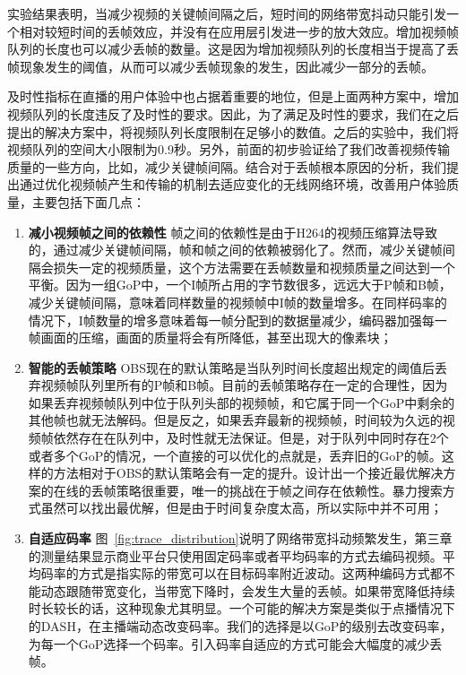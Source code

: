 实验结果表明，当减少视频的关键帧间隔之后，短时间的网络带宽抖动只能引发一个相对较短时间的丢帧效应，并没有在应用层引发进一步的放大效应。增加视频帧队列的长度也可以减少丢帧的数量。这是因为增加视频队列的长度相当于提高了丢帧现象发生的阈值，从而可以减少丢帧现象的发生，因此减少一部分的丢帧。

及时性指标在直播的用户体验中也占据着重要的地位，但是上面两种方案中，增加视频队列的长度违反了及时性的要求。因此，为了满足及时性的要求，我们在之后提出的解决方案中，将视频队列长度限制在足够小的数值。之后的实验中，我们将视频队列的空间大小限制为0.9秒。另外，前面的初步验证给了我们改善视频传输质量的一些方向，比如，减少关键帧间隔。结合对于丢帧根本原因的分析，我们提出通过优化视频帧产生和传输的机制去适应变化的无线网络环境，改善用户体验质量，主要包括下面几点：

\begin{enumerate}[1)]
\item \textbf{减小视频帧之间的依赖性} 帧之间的依赖性是由于H264的视频压缩算法导致的，通过减少关键帧间隔，帧和帧之间的依赖被弱化了。然而，减少关键帧间隔会损失一定的视频质量，这个方法需要在丢帧数量和视频质量之间达到一个平衡。因为一组GoP中，一个I帧所占用的字节数很多，远远大于P帧和B帧，减少关键帧间隔，意味着同样数量的视频帧中I帧的数量增多。在同样码率的情况下，I帧数量的增多意味着每一帧分配到的数据量减少，编码器加强每一帧画面的压缩，画面的质量将会有所降低，甚至出现大的像素块；
\item \textbf{智能的丢帧策略} OBS现在的默认策略是当队列时间长度超出规定的阈值后丢弃视频帧队列里所有的P帧和B帧。目前的丢帧策略存在一定的合理性，因为如果丢弃视频帧队列中位于队列头部的视频帧，和它属于同一个GoP中剩余的其他帧也就无法解码。但是反之，如果丢弃最新的视频帧，时间较为久远的视频帧依然存在在队列中，及时性就无法保证。但是，对于队列中同时存在2个或者多个GoP的情况，一个直接的可以优化的点就是，丢弃旧的GoP的帧。这样的方法相对于OBS的默认策略会有一定的提升。设计出一个接近最优解决方案的在线的丢帧策略很重要，唯一的挑战在于帧之间存在依赖性。暴力搜索方式虽然可以找出最优解，但是由于时间复杂度太高，所以实际中并不可用；
\item \textbf{自适应码率} 图~\ref{fig:trace_distribution}说明了网络带宽抖动频繁发生，第三章的测量结果显示商业平台只使用固定码率或者平均码率的方式去编码视频。平均码率的方式是指实际的带宽可以在目标码率附近波动。这两种编码方式都不能动态跟随带宽变化，当带宽下降时，会发生大量的丢帧。如果带宽降低持续时长较长的话，这种现象尤其明显。一个可能的解决方案是类似于点播情况下的DASH，在主播端动态改变码率。我们的选择是以GoP的级别去改变码率，为每一个GoP选择一个码率。引入码率自适应的方式可能会大幅度的减少丢帧。
\end{enumerate}


